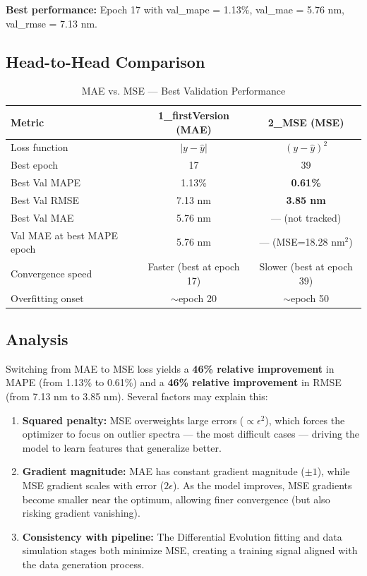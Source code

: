 \documentclass[11pt,a4paper]{article}
\begin{document}
\textbf{Best performance:} Epoch 17 with val\_mape = 1.13\%, val\_mae = 5.76 nm, val\_rmse = 7.13 nm.

\subsection{Head-to-Head Comparison}

\begin{table}[H]
\centering
\caption{MAE vs. MSE — Best Validation Performance}
\begin{tabular}{lcc}
\toprule
\textbf{Metric} & \textbf{1\_firstVersion (MAE)} & \textbf{2\_MSE (MSE)} \\
\midrule
Loss function & $|y - \hat{y}|$ & $(y - \hat{y})^2$ \\
Best epoch & 17 & 39 \\
Best Val MAPE & 1.13\% & \textbf{0.61\%} \\
Best Val RMSE & 7.13 nm & \textbf{3.85 nm} \\
Best Val MAE & 5.76 nm & — (not tracked) \\
Val MAE at best MAPE epoch & 5.76 nm & — (MSE=18.28 nm$^2$) \\
Convergence speed & Faster (best at epoch 17) & Slower (best at epoch 39) \\
Overfitting onset & $\sim$epoch 20 & $\sim$epoch 50 \\
\bottomrule
\end{tabular}
\end{table}

\subsection{Analysis}

Switching from MAE to MSE loss yields a \textbf{46\% relative improvement} in MAPE (from 1.13\% to 0.61\%) and a \textbf{46\% relative improvement} in RMSE (from 7.13 nm to 3.85 nm). Several factors may explain this:

\begin{enumerate}
    \item \textbf{Squared penalty:} MSE overweights large errors ($\propto \epsilon^2$), which forces the optimizer to focus on outlier spectra — the most difficult cases — driving the model to learn features that generalize better.
    \item \textbf{Gradient magnitude:} MAE has constant gradient magnitude ($\pm 1$), while MSE gradient scales with error ($2\epsilon$). As the model improves, MSE gradients become smaller near the optimum, allowing finer convergence (but also risking gradient vanishing).
    \item \textbf{Consistency with pipeline:} The Differential Evolution fitting and data simulation stages both minimize MSE, creating a training signal aligned with the data generation process.
\end{enumerate}
\end{document}
